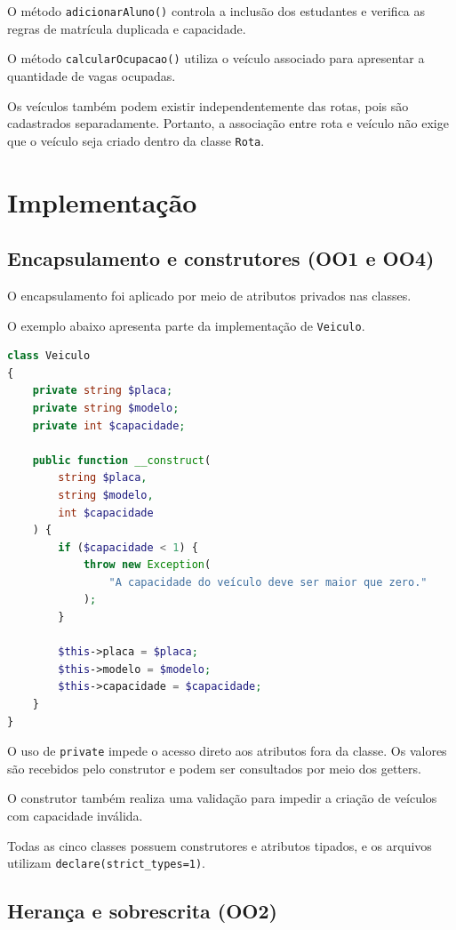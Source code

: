 \documentclass[12pt,a4paper]{article}
\begin{document}
O método \texttt{adicionarAluno()} controla a inclusão dos estudantes e verifica as regras de matrícula duplicada e capacidade.

O método \texttt{calcularOcupacao()} utiliza o veículo associado para apresentar a quantidade de vagas ocupadas.

Os veículos também podem existir independentemente das rotas, pois são cadastrados separadamente. Portanto, a associação entre rota e veículo não exige que o veículo seja criado dentro da classe \texttt{Rota}.

\section{Implementação}

\subsection{Encapsulamento e construtores (OO1 e OO4)}

O encapsulamento foi aplicado por meio de atributos privados nas classes.

O exemplo abaixo apresenta parte da implementação de \texttt{Veiculo}.

\begin{lstlisting}[language=PHP]
class Veiculo
{
    private string $placa;
    private string $modelo;
    private int $capacidade;

    public function __construct(
        string $placa,
        string $modelo,
        int $capacidade
    ) {
        if ($capacidade < 1) {
            throw new Exception(
                "A capacidade do veículo deve ser maior que zero."
            );
        }

        $this->placa = $placa;
        $this->modelo = $modelo;
        $this->capacidade = $capacidade;
    }
}
\end{lstlisting}

O uso de \texttt{private} impede o acesso direto aos atributos fora da classe. Os valores são recebidos pelo construtor e podem ser consultados por meio dos getters.

O construtor também realiza uma validação para impedir a criação de veículos com capacidade inválida.

Todas as cinco classes possuem construtores e atributos tipados, e os arquivos utilizam \texttt{declare(strict\_types=1)}.

\subsection{Herança e sobrescrita (OO2)}
\end{document}
